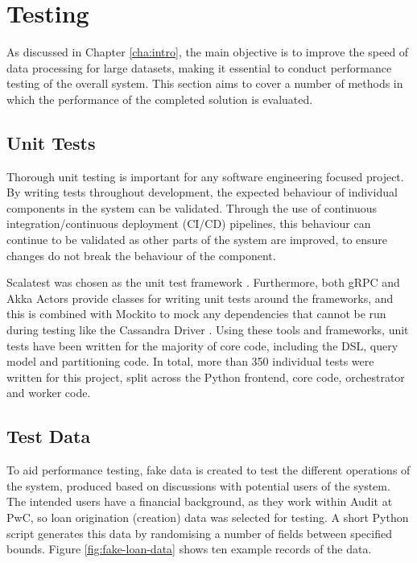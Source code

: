 \chapter{Testing}\label{cha:testing}


As discussed in Chapter \ref{cha:intro}, the main objective is to improve the speed of data processing for large datasets, making it essential to conduct performance testing of the overall system. This section aims to cover a number of methods in which the performance of the completed solution is evaluated.




\section{Unit Tests}
Thorough unit testing is important for any software engineering focused project. By writing tests throughout development, the expected behaviour of individual components in the system can be validated. Through the use of continuous integration/continuous deployment (CI/CD) pipelines, this behaviour can continue to be validated as other parts of the system are improved, to ensure changes do not break the behaviour of the component. 

Scalatest was chosen as the unit test framework \cite{scalatestuserguide}. Furthermore, both gRPC and Akka Actors provide classes for writing unit tests around the frameworks, and this is combined with Mockito to mock any dependencies that cannot be run during testing like the Cassandra Driver \cite{scalatestplusmockito, datastaxjavadriver}. Using these tools and frameworks, unit tests have been written for the majority of core code, including the DSL, query model and partitioning code. In total, more than 350 individual tests were written for this project, split across the Python frontend, core code, orchestrator and worker code.



\section{Test Data}
To aid performance testing, fake data is created to test the different operations of the system, produced based on discussions with potential users of the system. The intended users have a financial background, as they work within Audit at PwC, so loan origination (creation) data was selected for testing. A short Python script generates this data by randomising a number of fields between specified bounds. Figure \ref{fig:fake-loan-data} shows ten example records of the data.

